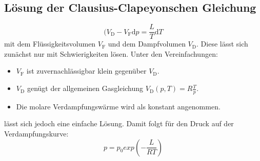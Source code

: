          \subsection{Lösung der Clausius-Clapeyonschen Gleichung}
         \begin{equation}
           (V_\text{D}-V_\text{F}\text{d}p = \frac{L}{T}\text{d}T \label{eq:DGL}
           \end{equation}
           mit dem Flüssigkeitsvolumen $V_\text{F}$ und dem Dampfvolumen $V_\text{D}$.
Diese lässt sich zunächst nur mit Schwierigkeiten lösen.
Unter den Vereinfachungen:
\begin{itemize}
  \item $V_\text{F}$ ist zuvernachlässigbar klein gegenüber $V_\text{D}$.
  \item $V_\text{D}$ genügt der allgemeinen Gasgleichung $V_\text{D}(p,T) = R\frac{T}{p}$.
  \item Die molare Verdampfungswärme wird als konstant angenommen.
\end{itemize}
lässt sich jedoch eine einfache Lösung. Damit folgt für den Druck auf der Verdampfungskurve:
\begin{equation}
  p = p_0 exp\left(-\frac{L}{RT}\right) \label{eq:DGLLs}
\end{equation}
